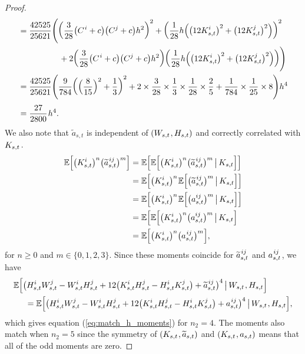 \documentclass[sn-mathphys-num]{sn-jnl}%
\newcommand{\E}{\mathbb{E}}
\newcommand{\m}{\hspace{0.25mm}}
\newcommand{\mm}{\hspace{5mm}}
\begin{document}
\begin{proof}
\begin{align*}
& = \frac{42525}{25621}\Bigg(\bigg(\frac{3}{28}\big(C^{\m i} + c\big)\big(C^j + c\big)h^2\bigg)^2 + \bigg(\frac{1}{28}h\Big(\big(12 K_{s,t}^i\big)^2 + \big(12 K_{s,t}^j\big)^2\Big)\bigg)^2\\
&\hspace{17.5mm} + 2\bigg(\frac{3}{28}\big(C^{\m i} + c\big)\big(C^j + c\big)h^2\bigg)\bigg(\frac{1}{28}h\Big(\big(12 K_{s,t}^i\big)^2 + \big(12 K_{s,t}^j\big)^2\Big)\bigg)\Bigg)\\
& = \frac{42525}{25621}\Bigg(\frac{9}{784}\bigg(\Big(\frac{8}{15}\Big)^2 + \frac{1}{3}\bigg)^2 + 2\times \frac{3}{28}\times\frac{1}{3}\times \frac{1}{28}\times\frac{2}{5} + \frac{1}{784}\times\frac{1}{25}\times 8\Bigg)h^4\\[3pt]
& = \frac{27}{2800}\m h^4.
\end{align*}
We also note that $\widetilde{a}_{s,t}$ is independent of $(W_{s,t}\m, H_{s,t})$ and correctly correlated with $K_{s,t}\m$.
\begin{align*}
\E\Big[\big(K_{s,t}^i\big)^n\big(\widetilde{a}_{s,t}^{\m ij}\big)^m\Big]
& = \E\Big[\E\Big[\big(K_{s,t}^i\big)^n\big(\widetilde{a}_{s,t}^{\m ij}\big)^m\,\big|\, K_{s,t}\Big]\Big]\\
& = \E\Big[\big(K_{s,t}^i\big)^n\m\E\Big[\big(\widetilde{a}_{s,t}^{\m ij}\big)^m\,\big|\, K_{s,t}\Big]\Big]\\
& = \E\Big[\big(K_{s,t}^i\big)^n\m\E\Big[\big(a_{s,t}^{ij}\big)^m\,\big|\, K_{s,t}\Big]\Big]\\
& = \E\Big[\E\Big[\big(K_{s,t}^i\big)^n\big(a_{s,t}^{ij}\big)^m\,\big|\, K_{s,t}\Big]\\
& = \E\Big[\big(K_{s,t}^i\big)^n\big(a_{s,t}^{\m ij}\big)^m\Big],
\end{align*}
for $n\geq 0$ and $m\in\{0,1,2,3\}$. Since these moments coincide for $\widetilde{a}_{s,t}^{\m ij}$ and $a_{s,t}^{\m ij}\m$, we have
\begin{align*}
&\E\Big[\big(H_{s,t}^i W_{s,t}^j - W_{s,t}^i H_{s,t}^j + 12\big(K_{s,t}^i H_{s,t}^j - H_{s,t}^i K_{s,t}^j\big) + \widetilde{a}_{s,t}^{\m ij}\big)^4\,\big|\, W_{s,t}\m, H_{s,t}\Big]\\
&\mm = \E\Big[\big(H_{s,t}^i W_{s,t}^j - W_{s,t}^i H_{s,t}^j + 12\big(K_{s,t}^i H_{s,t}^j - H_{s,t}^i K_{s,t}^j\big) + a_{s,t}^{\m ij}\big)^4\,\big|\, W_{s,t}\m, H_{s,t}\Big],
\end{align*}
which gives equation (\ref{eq:match_h_moments}) for $n_2 = 4$. The moments also match when $n_2 = 5$ since the symmetry of $(K_{s,t}\m,\widetilde{a}_{s,t})$ and $(K_{s,t}\m,a_{s,t})$ means that all of the odd moments are zero.

\end{proof}
\end{document}
